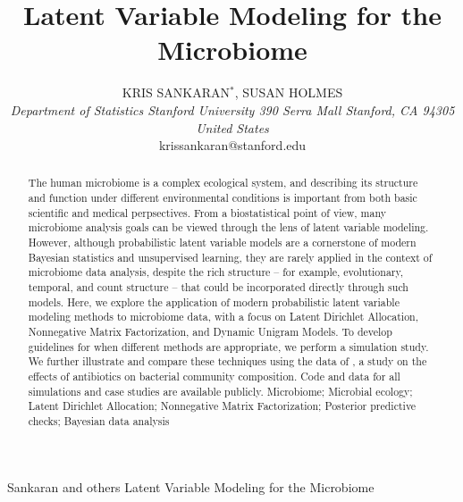 \documentclass[oupdraft]{bio}
\begin{document}
\title{Latent Variable Modeling for the Microbiome}

\author{
  KRIS SANKARAN$^\ast$, SUSAN HOLMES\\[4pt]
  \textit{
    Department of Statistics
    Stanford University
    390 Serra Mall
    Stanford, CA 94305
    United States
  } \\[2pt]
  {krissankaran@stanford.edu}
}

\markboth
{Sankaran and others}
{Latent Variable Modeling for the Microbiome}

\maketitle


\begin{abstract}
  {
    The human microbiome is a complex ecological system, and describing its
    structure and function under different environmental conditions is important
    from both basic scientific and medical perpsectives. From a biostatistical
    point of view, many microbiome analysis goals can be viewed through the lens
    of latent variable modeling. However, although probabilistic latent variable
    models are a cornerstone of modern Bayesian statistics and unsupervised
    learning, they are rarely applied in the context of microbiome data
    analysis, despite the rich structure -- for example, evolutionary, temporal,
    and count structure -- that could be incorporated directly through such
    models. Here, we explore the application of modern probabilistic latent
    variable modeling methods to microbiome data, with a focus on Latent
    Dirichlet Allocation, Nonnegative Matrix Factorization, and Dynamic Unigram
    Models. To develop guidelines for when different methods are appropriate, we
    perform a simulation study. We further illustrate and compare these
    techniques using the data of \citep{dethlefsen2011incomplete}, a study on
    the effects of antibiotics on bacterial community composition. Code and data
    for all simulations and case studies are available publicly.
  }
  {
    Microbiome; Microbial ecology; Latent Dirichlet Allocation; Nonnegative
    Matrix Factorization; Posterior predictive checks; Bayesian data analysis
  }
\end{abstract}
\end{document}
